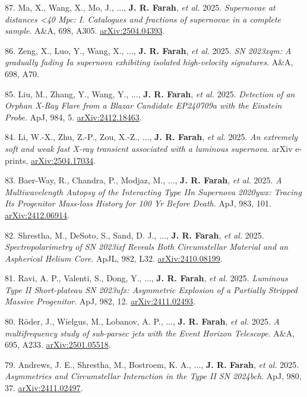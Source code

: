 \documentclass[margin,line]{res}
\newcommand{\apj}{ApJ}                    %
\newcommand{\apjl}{ApJL}                  %
\newcommand{\aap}{A\&A}                   %
\begin{document}
\begin{resume}
87. Ma, X., Wang, X., Mo, J., ..., \textbf{J. R. Farah}, \textit{et al.} 2025. \textit{Supernovae at distances <40 Mpc: I. Catalogues and fractions of supernovae in a complete sample}. \aap, 698, A305. \href{https://arxiv.org/abs/2504.04393}{arXiv:2504.04393}.

86. Zeng, X., Luo, Y., Wang, X., ..., \textbf{J. R. Farah}, \textit{et al.} 2025. \textit{SN 2023xqm: A gradually fading Ia supernova exhibiting isolated high-velocity signatures}. \aap, 698, A70.

85. Liu, M., Zhang, Y., Wang, Y., ..., \textbf{J. R. Farah}, \textit{et al.} 2025. \textit{Detection of an Orphan X-Ray Flare from a Blazar Candidate EP240709a with the Einstein Probe}. \apj, 984, 5. \href{https://arxiv.org/abs/2412.18463}{arXiv:2412.18463}.

84. Li, W.-X., Zhu, Z.-P., Zou, X.-Z., ..., \textbf{J. R. Farah}, \textit{et al.} 2025. \textit{An extremely soft and weak fast X-ray transient associated with a luminous supernova}. arXiv e-prints, \href{https://arxiv.org/abs/2504.17034}{arXiv:2504.17034}.

83. Baer-Way, R., Chandra, P., Modjaz, M., ..., \textbf{J. R. Farah}, \textit{et al.} 2025. \textit{A Multiwavelength Autopsy of the Interacting Type IIn Supernova 2020ywx: Tracing Its Progenitor Mass-loss History for 100 Yr Before Death}. \apj, 983, 101. \href{https://arxiv.org/abs/2412.06914}{arXiv:2412.06914}.

82. Shrestha, M., DeSoto, S., Sand, D. J., ..., \textbf{J. R. Farah}, \textit{et al.} 2025. \textit{Spectropolarimetry of SN 2023ixf Reveals Both Circumstellar Material and an Aspherical Helium Core}. \apjl, 982, L32. \href{https://arxiv.org/abs/2410.08199}{arXiv:2410.08199}.

81. Ravi, A. P., Valenti, S., Dong, Y., ..., \textbf{J. R. Farah}, \textit{et al.} 2025. \textit{Luminous Type II Short-plateau SN 2023ufx: Asymmetric Explosion of a Partially Stripped Massive Progenitor}. \apj, 982, 12. \href{https://arxiv.org/abs/2411.02493}{arXiv:2411.02493}.

80. R{\"o}der, J., Wielgus, M., Lobanov, A. P., ..., \textbf{J. R. Farah}, \textit{et al.} 2025. \textit{A multifrequency study of sub-parsec jets with the Event Horizon Telescope}. \aap, 695, A233. \href{https://arxiv.org/abs/2501.05518}{arXiv:2501.05518}.

79. Andrews, J. E., Shrestha, M., Bostroem, K. A., ..., \textbf{J. R. Farah}, \textit{et al.} 2025. \textit{Asymmetries and Circumstellar Interaction in the Type II SN 2024bch}. \apj, 980, 37. \href{https://arxiv.org/abs/2411.02497}{arXiv:2411.02497}.


\end{resume}
\end{document}
